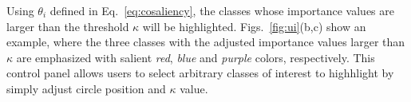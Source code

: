 Using $\theta_i$  defined in Eq.~\ref{eq:cosaliency}, the classes whose importance values are larger than the threshold $\kappa$ will be highlighted. 
Figs.~\ref{fig:ui}(b,c) show an example, where the three classes with the adjusted importance values larger than $\kappa$ are emphasized with salient \emph{red}, \emph{blue} and \emph{purple} colors, respectively.
This control panel allows users to select arbitrary classes of interest to highhlight by simply adjust circle position and $\kappa$ value.

%
%
%
%
%
%
%
